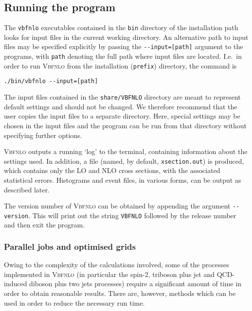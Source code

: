 \documentclass[english,12pt]{article}
\begin{document}

\subsection{Running the program}

The {\tt vbfnlo} executables contained in the {\tt bin}
directory of the installation path looks for input files in the current working
directory. An alternative path to input files may be specified explicitly by
passing the {\tt -{}-input=[path]} argument to the programs, with {\tt path}
denoting the full path where input files are located.  I.e.\ in order to run
\textsc{Vbfnlo} from the installation ({\tt prefix}) directory, the command is
\begin{center}
{\tt ./bin/vbfnlo -{}-input=[path]}
\end{center}
The input files contained in the {\tt share/VBFNLO} directory are meant to
represent default settings and should not be changed. We therefore recommend
that the user copies the input files to a separate directory. Here, special
settings may be chosen in the input files and the program can be run from that
directory without specifying further options.  

\textsc{Vbfnlo} outputs a running `log' to the terminal, containing information
about the settings used.  In addition, a file (named, by default, {\tt xsection.out}) is produced,
which contains only the LO and NLO cross sections, with the associated statistical errors. 
Histograms and event files, in various forms, can be output as described later.

\noindent The version number of \textsc{Vbfnlo} can be obtained by appending the
argument {\tt -{}-version}. This will print out the string {\tt VBFNLO}
followed by the release number and then exit the program.


\subsubsection{Parallel jobs and optimised grids}
Owing to the complexity of the calculations involved, some of the processes
implemented in \textsc{Vbfnlo} (in particular the spin-2, triboson
plus jet and QCD-induced diboson plus two jets processes) 
require a significant amount of time in order to obtain
reasonable results.  There are, however, methods which can be used in order to
reduce the necessary run time.
\end{document}
